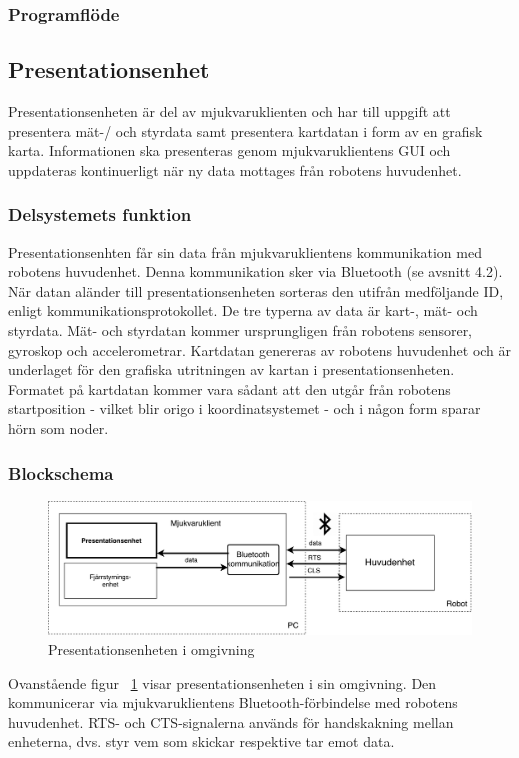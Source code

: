 \documentclass{article}
\begin{document}
\subsubsection{Programflöde}

\clearpage

\subsection{Presentationsenhet}
Presentationsenheten är del av mjukvaruklienten och har till uppgift att presentera mät-/ och styrdata samt presentera kartdatan i form av en grafisk karta. Informationen ska presenteras genom mjukvaruklientens GUI och uppdateras kontinuerligt när ny data mottages från robotens huvudenhet. 

\subsubsection{Delsystemets funktion}
Presentationsenhten får sin data från mjukvaruklientens kommunikation med robotens huvudenhet. Denna kommunikation sker via Bluetooth (se avsnitt 4.2). När datan aländer till presentationsenheten sorteras den utifrån medföljande ID, enligt kommunikationsprotokollet. De tre typerna av data är kart-, mät- och styrdata. Mät- och styrdatan kommer ursprungligen från robotens sensorer, gyroskop och accelerometrar. Kartdatan genereras av robotens huvudenhet och är underlaget för den grafiska utritningen av kartan i presentationsenheten. Formatet på kartdatan kommer vara sådant att den utgår från robotens startposition - vilket blir origo i koordinatsystemet - och i någon form sparar hörn som noder. 

\subsubsection{Blockschema}
\begin{figure}[H]
\includegraphics[scale=0.5]{Oversikt_presentationsenhet2}
\caption{Presentationsenheten i omgivning}
\label{fig:Oversikt_presentationsenhet2}
\end{figure}
Ovanstående figur ~\ref{fig:Oversikt_presentationsenhet2} visar presentationsenheten i sin omgivning. Den kommunicerar via mjukvaruklientens Bluetooth-förbindelse med robotens huvudenhet. RTS- och CTS-signalerna används för handskakning mellan enheterna, dvs. styr vem som skickar respektive tar emot data.  
\end{document}
